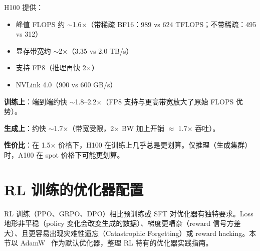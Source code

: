 \begin{intuitionbox}[H100 vs A100：何时升级才值得？]
H100 提供：

\begin{itemize}
  \item 峰值 FLOPS 约 $\sim$1.6$\times$（带稀疏 BF16：989 vs 624 TFLOPS；不带稀疏：495 vs 312）
  \item 显存带宽约 $\sim$2$\times$（3.35 vs 2.0 TB/s）
  \item 支持 FP8（推理再快 2$\times$）
  \item NVLink 4.0（900 vs 600 GB/s）
\end{itemize}

\textbf{训练上}：端到端约快 $\sim$1.8--2.2$\times$（FP8 支持与更高带宽放大了原始 FLOPS 优势）。

\textbf{生成上}：约快 $\sim$1.7$\times$（带宽受限，2$\times$ BW 加上开销 $\approx$ 1.7$\times$ 吞吐）。

\textbf{性价比}：在 1.5$\times$ 价格下，H100 在训练上几乎总是更划算。仅推理（生成集群）时，A100 在 spot 价格下可能更划算。
\end{intuitionbox}

\section{RL 训练的优化器配置}
\label{sec:rl-optimizer-config}

RL 训练（PPO、GRPO、DPO）相比预训练或 SFT 对优化器有独特要求。Loss 地形非平稳（policy 变化会改变生成的数据）、梯度更嘈杂（reward 信号方差大）、且更容易出现灾难性遗忘（Catastrophic Forgetting）或 reward hacking。本节以 AdamW~\cite{loshchilov2019adamw} 作为默认优化器，整理 RL 特有的优化器实践指南。

